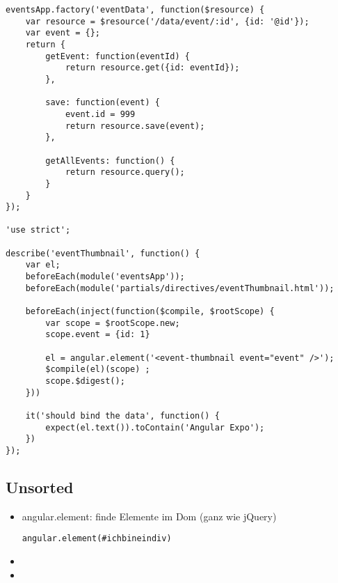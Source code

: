 \begin{itemize}
\begin{itemize}
\begin{verbatim}
eventsApp.factory('eventData', function($resource) {
    var resource = $resource('/data/event/:id', {id: '@id'});
    var event = {};
    return {
        getEvent: function(eventId) {
            return resource.get({id: eventId});
        },

        save: function(event) {
            event.id = 999
            return resource.save(event);
        },

        getAllEvents: function() {
            return resource.query();
        }
    }
});

'use strict';

describe('eventThumbnail', function() {
    var el;
    beforeEach(module('eventsApp'));
    beforeEach(module('partials/directives/eventThumbnail.html'));

    beforeEach(inject(function($compile, $rootScope) {
        var scope = $rootScope.new;
        scope.event = {id: 1}

        el = angular.element('<event-thumbnail event="event" />');
        $compile(el)(scope) ;
        scope.$digest();
    }))

    it('should bind the data', function() {
        expect(el.text()).toContain('Angular Expo');
    })
});
        \end{verbatim}
    \end{itemize}
\end{itemize}


\subsection{Unsorted}
\begin{itemize}
  \item angular.element: finde Elemente im Dom (ganz wie jQuery)
    \begin{verbatim}
angular.element(#ichbineindiv)
    \end{verbatim}
  \item
  \item
\end{itemize}




